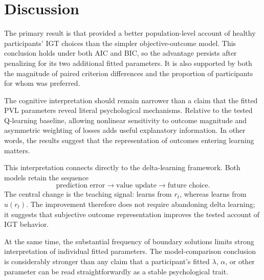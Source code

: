 \section{Discussion}

The primary result is that \PVL{} provided a better population-level account of healthy participants' IGT choices than the simpler objective-outcome \QL{} model. This conclusion holds under both AIC and BIC, so the advantage persists after penalizing \PVL{} for its two additional fitted parameters. It is also supported by both the magnitude of paired criterion differences and the proportion of participants for whom \PVL{} was preferred.

The cognitive interpretation should remain narrower than a claim that the fitted PVL parameters reveal literal psychological mechanisms. Relative to the tested Q-learning baseline, allowing nonlinear sensitivity to outcome magnitude and asymmetric weighting of losses adds useful explanatory information. In other words, the results suggest that the representation of outcomes entering learning matters.

This interpretation connects directly to the delta-learning framework. Both models retain the sequence
\begin{equation}
\text{prediction error}\rightarrow\text{value update}\rightarrow\text{future choice}.
\end{equation}
The central change is the teaching signal: \QL{} learns from \(r_t\), whereas \PVL{} learns from \(u(r_t)\). The improvement therefore does not require abandoning delta learning; it suggests that subjective outcome representation improves the tested account of IGT behavior.

At the same time, the substantial frequency of boundary solutions limits strong interpretation of individual fitted parameters. The model-comparison conclusion is considerably stronger than any claim that a participant's fitted \(\lambda\), \(\alpha\), or other parameter can be read straightforwardly as a stable psychological trait.
